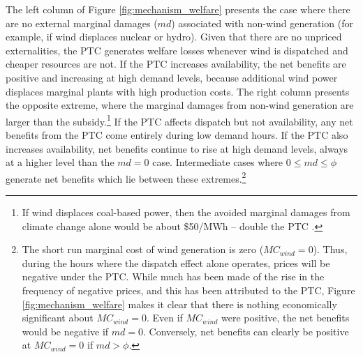 \documentclass[12pt]{article}
\begin{document}
The left column of Figure \ref{fig:mechanism_welfare} presents the case where there are no external marginal damages ($md$) associated with non-wind generation (for example, if wind displaces nuclear or hydro). Given that there are no unpriced externalities, the PTC generates welfare losses whenever wind is dispatched and cheaper resources are not. If the PTC increases availability, the net benefits are positive and increasing at high demand levels, because additional wind power displaces marginal plants with high production costs. The right column presents the opposite extreme, where the marginal damages from non-wind generation are larger than the subsidy.\footnote{If wind displaces coal-based power, then the avoided marginal damages from climate change alone would be about \$50/MWh -- double the PTC \citep{iawg_2016}.} If the PTC affects dispatch but not availability, any net benefits from the PTC come entirely during low demand hours. If the PTC also increases availability, net benefits continue to rise at high demand levels, always at a higher level than the $md=0$ case. Intermediate cases where $0 \le md \le \phi$ generate net benefits which lie between these extremes.\footnote{The short run marginal cost of wind generation is zero ($MC_{wind} = 0$). Thus, during the hours where the dispatch effect alone operates, prices will be negative under the PTC. While much has been made of the rise in the frequency of negative prices, and this has been attributed to the PTC, Figure \ref{fig:mechanism_welfare} makes it clear that there is nothing economically significant about $MC_{wind} = 0$. Even if $MC_{wind}$ were positive, the net benefits would be negative if $md = 0$. Conversely, net benefits can clearly be positive at $MC_{wind} = 0$ if $md > \phi$.}
\end{document}
